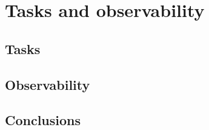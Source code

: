 \chapter{Tasks and observability}
\minitoc


\section{Tasks}

\section{Observability}

\section{Conclusions}